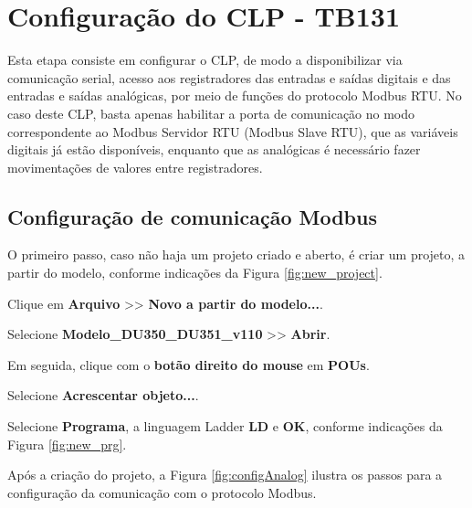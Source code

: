 \chapter{Configuração do CLP - TB131}
\label{chap:configuracao-clp}


Esta etapa consiste em configurar o CLP, 
de modo a disponibilizar via comunicação serial, acesso aos registradores das entradas e saídas digitais e das entradas e saídas analógicas, por meio de funções do protocolo Modbus RTU. 
No caso deste CLP, 
basta apenas habilitar a porta de comunicação no modo correspondente ao Modbus Servidor RTU (Modbus Slave RTU), que as variáveis digitais já estão disponíveis, enquanto que as analógicas é necessário fazer movimentações de valores entre registradores.


\section{Configuração de comunicação Modbus}

O primeiro passo, caso não haja um projeto criado e aberto, é criar um projeto, a partir do modelo, conforme indicações da Figura \ref{fig:new_project}.

Clique em \textbf{Arquivo} >> \textbf{Novo a partir do modelo...}.

Selecione \textbf{Modelo\_DU350\_DU351\_v110} >> \textbf{Abrir}.

\begin{figure}[ht!]
	\centering
\end{figure}

Em seguida, clique com o \textbf{botão direito do mouse} em \textbf{POUs}.

Selecione \textbf{Acrescentar objeto...}. 

Selecione \textbf{Programa}, a linguagem Ladder \textbf{LD} e \textbf{OK}, 
conforme indicações da Figura \ref{fig:new_prg}.



\begin{figure}[ht!]
	\centering
\end{figure}




Após a criação do projeto, a Figura \ref{fig:configAnalog} ilustra os passos para a configuração da comunicação com o protocolo Modbus. 


